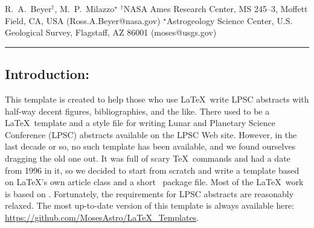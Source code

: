 \documentclass[twoside]{article}
\begin{document}

{R.~A.~Beyer$^{\dag}$, M.~P.~Milazzo$^{\star}$ $^{\dag}$NASA Ames Research Center, MS 245--3, Moffett Field, CA, USA (Ross.A.Beyer@nasa.gov) $^{\star}
$Astrogeology Science Center, U.S. Geological Survey, Flagstaff, AZ 86001 (moses@usgs.gov) \\ \hrule
}

%

%


\balance{}


\subsection*{\hspace{0.5cm}Introduction:} This template is created to help those who use \LaTeX\ write LPSC abstracts with half-way decent figures, bibliographies,
and the like.
There used to be a \LaTeX\ template and a style file for writing Lunar and Planetary Science Conference (LPSC) abstracts available
on the LPSC Web site.
However, in the last decade or so, no such template has been available, and we found ourselves dragging the old one out.
It was full of scary \TeX\ commands and had a date from 1996 in it, so we decided to start from scratch and write a template based on \LaTeX's own article class and a short \LaTeXe\ package file.
Most of the \LaTeX\ work is based on \citep{kopka2003guide}.
Fortunately, the requirements for LPSC abstracts \citep{LPSC} are reasonably relaxed.
The most up-to-date version of this template is always available here:\\
\url{https://github.com/MosesAstro/LaTeX_Templates}.
\end{document}
